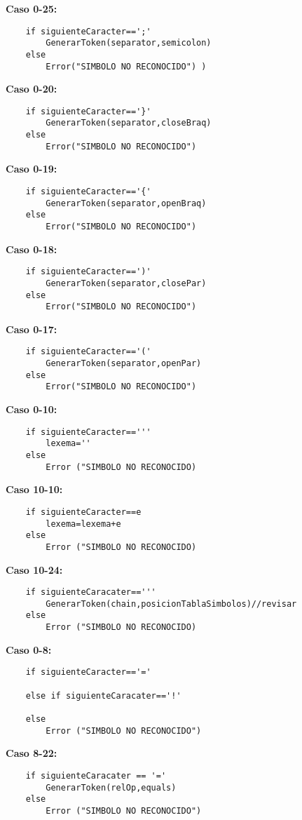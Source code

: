 \documentclass{article}
\begin{document}
\textbf{Caso 0-25:}
\begin{verbatim}
    if siguienteCaracter==';'
        GenerarToken(separator,semicolon)
    else
        Error("SIMBOLO NO RECONOCIDO") )
\end{verbatim}

\textbf{Caso 0-20:}
\begin{verbatim}
    if siguienteCaracter=='}'
        GenerarToken(separator,closeBraq)
    else
        Error("SIMBOLO NO RECONOCIDO")  
\end{verbatim}

\textbf{Caso 0-19:}
\begin{verbatim}
    if siguienteCaracter=='{'
        GenerarToken(separator,openBraq)
    else
        Error("SIMBOLO NO RECONOCIDO")
\end{verbatim}

\textbf{Caso 0-18:}
\begin{verbatim}
    if siguienteCaracter==')'
        GenerarToken(separator,closePar)
    else
        Error("SIMBOLO NO RECONOCIDO")  
\end{verbatim}

\textbf{Caso 0-17:}
\begin{verbatim}
    if siguienteCaracter=='('
        GenerarToken(separator,openPar)
    else
        Error("SIMBOLO NO RECONOCIDO")
\end{verbatim}

\textbf{Caso 0-10:}
\begin{verbatim}
    if siguienteCaracter=='''
        lexema=''
    else
        Error ("SIMBOLO NO RECONOCIDO)
\end{verbatim}

\textbf{Caso 10-10:}
\begin{verbatim}
    if siguienteCaracter==e
        lexema=lexema+e
    else 
        Error ("SIMBOLO NO RECONOCIDO)
\end{verbatim}

\textbf{Caso 10-24:}
\begin{verbatim}
    if siguienteCaracater=='''
        GenerarToken(chain,posicionTablaSimbolos)//revisar
    else 
        Error ("SIMBOLO NO RECONOCIDO)
\end{verbatim}

\textbf{Caso 0-8:}
\begin{verbatim}
    if siguienteCaracter=='='

    else if siguienteCaracater=='!'
    
    else 
        Error ("SIMBOLO NO RECONOCIDO")
\end{verbatim}

\textbf{Caso 8-22:}
\begin{verbatim}
    if siguienteCaracater == '='
        GenerarToken(relOp,equals)
    else 
        Error ("SIMBOLO NO RECONOCIDO")  
\end{verbatim}
\end{document}
